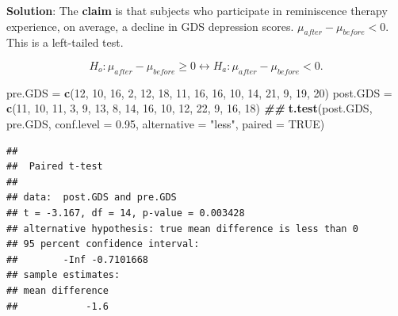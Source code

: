 \documentclass[
]{book}
\newenvironment{Shaded}{\begin{snugshade}}{\end{snugshade}}
\newcommand{\AttributeTok}[1]{\textcolor[rgb]{0.13,0.29,0.53}{#1}}
\newcommand{\ConstantTok}[1]{\textcolor[rgb]{0.56,0.35,0.01}{#1}}
\newcommand{\DecValTok}[1]{\textcolor[rgb]{0.00,0.00,0.81}{#1}}
\newcommand{\DocumentationTok}[1]{\textcolor[rgb]{0.56,0.35,0.01}{\textbf{\textit{#1}}}}
\newcommand{\FloatTok}[1]{\textcolor[rgb]{0.00,0.00,0.81}{#1}}
\newcommand{\FunctionTok}[1]{\textcolor[rgb]{0.13,0.29,0.53}{\textbf{#1}}}
\newcommand{\NormalTok}[1]{#1}
\newcommand{\OtherTok}[1]{\textcolor[rgb]{0.56,0.35,0.01}{#1}}
\newcommand{\StringTok}[1]{\textcolor[rgb]{0.31,0.60,0.02}{#1}}
\begin{document}
\textbf{Solution}: The \textbf{claim} is that subjects who participate in reminiscence therapy experience, on average, a decline in GDS depression scores. \(\mu_{after} - \mu_{before} < 0\). This is a left-tailed test.

\[
H_o: \mu_{after} - \mu_{before} \ge 0 \leftrightarrow  H_a: \mu_{after} - \mu_{before} < 0 .
\]

\begin{Shaded}
\begin{Highlighting}[]
\NormalTok{pre.GDS }\OtherTok{=} \FunctionTok{c}\NormalTok{(}\DecValTok{12}\NormalTok{, }\DecValTok{10}\NormalTok{, }\DecValTok{16}\NormalTok{, }\DecValTok{2}\NormalTok{, }\DecValTok{12}\NormalTok{, }\DecValTok{18}\NormalTok{, }\DecValTok{11}\NormalTok{, }\DecValTok{16}\NormalTok{, }\DecValTok{16}\NormalTok{, }\DecValTok{10}\NormalTok{, }\DecValTok{14}\NormalTok{, }\DecValTok{21}\NormalTok{, }\DecValTok{9}\NormalTok{, }\DecValTok{19}\NormalTok{, }\DecValTok{20}\NormalTok{)}
\NormalTok{post.GDS }\OtherTok{=} \FunctionTok{c}\NormalTok{(}\DecValTok{11}\NormalTok{, }\DecValTok{10}\NormalTok{, }\DecValTok{11}\NormalTok{, }\DecValTok{3}\NormalTok{,  }\DecValTok{9}\NormalTok{, }\DecValTok{13}\NormalTok{,  }\DecValTok{8}\NormalTok{, }\DecValTok{14}\NormalTok{, }\DecValTok{16}\NormalTok{, }\DecValTok{10}\NormalTok{, }\DecValTok{12}\NormalTok{, }\DecValTok{22}\NormalTok{, }\DecValTok{9}\NormalTok{, }\DecValTok{16}\NormalTok{, }\DecValTok{18}\NormalTok{)}
\DocumentationTok{\#\#}
\FunctionTok{t.test}\NormalTok{(post.GDS, pre.GDS,  }
       \AttributeTok{conf.level =} \FloatTok{0.95}\NormalTok{, }
       \AttributeTok{alternative =} \StringTok{"less"}\NormalTok{, }
       \AttributeTok{paired =} \ConstantTok{TRUE}\NormalTok{)}
\end{Highlighting}
\end{Shaded}

\begin{verbatim}
## 
##  Paired t-test
## 
## data:  post.GDS and pre.GDS
## t = -3.167, df = 14, p-value = 0.003428
## alternative hypothesis: true mean difference is less than 0
## 95 percent confidence interval:
##        -Inf -0.7101668
## sample estimates:
## mean difference 
##            -1.6
\end{verbatim}
\end{document}
